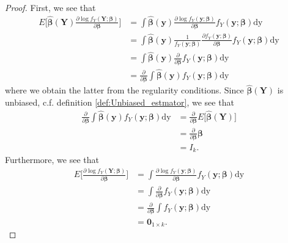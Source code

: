 \begin{proof}
First, we see that
\begin{align*}
    E\Big[\boldsymbol{\hat{\beta}}(\textbf{Y}) \frac{\partial \log f_Y(\textbf{Y};\boldsymbol{\beta})}{\partial \boldsymbol{\beta}} \Big]
    &=\int \boldsymbol{\hat{\beta}}(\textbf{y})\frac{\partial \log f_Y(\textbf{y};\boldsymbol{\beta})}{\partial \boldsymbol{\beta}}f_Y(\textbf{y};\boldsymbol{\beta}) \text{dy} \\
    &= \int \boldsymbol{\hat{\beta}}(\textbf{y})\frac{1}{f_Y(\textbf{y};\boldsymbol{\beta})}\frac{\partial f_Y(\textbf{y};\boldsymbol{\beta})}{\partial \boldsymbol{\beta}}f_Y(\textbf{y};\boldsymbol{\beta}) \text{dy} \\
    &=\int \boldsymbol{\hat{\beta}}(\textbf{y}) \frac{\partial}{\partial \boldsymbol{\beta}}f_Y(\textbf{y};\boldsymbol{\beta}) \text{dy} \\
    &=\frac{\partial}{\partial \boldsymbol{\beta}} \int \boldsymbol{\hat{\beta}}(\textbf{y}) f_Y(\textbf{y};\boldsymbol{\beta}) \text{dy}
\end{align*}
where we obtain the latter from the regularity conditions. 
Since $\boldsymbol{\hat{\beta}}(\textbf{Y})$ is unbiased, c.f. definition \ref{def:Unbiased_estmator}, we see that
\begin{align}
    \frac{\partial}{\partial \boldsymbol{\beta}} \int \boldsymbol{\hat{\beta}}(\textbf{y}) f_Y(\textbf{y};\boldsymbol{\beta}) \text{dy} &= \frac{\partial}{\partial\boldsymbol{\beta}} E\big[ \boldsymbol{\hat{\beta}}(\textbf{Y})\big] \nonumber\\
    &= \frac{\partial}{\partial\boldsymbol{\beta}} \boldsymbol{\beta} \nonumber\\
    &= I_{k} \label{eq:cramerraoe2stjerner}.
\end{align}
Furthermore, we see that
\begin{align}
    E\Big[ \frac{\partial \log f_Y(\textbf{Y};\boldsymbol{\beta})}{\partial \boldsymbol{\beta}}\Big] &= \int \frac{\partial \log f_Y(\textbf{y};\boldsymbol{\beta})}{\partial \boldsymbol{\beta}}f_Y(\textbf{y};\boldsymbol{\beta}) \text{dy} \nonumber \\
    &=\int  \frac{\partial}{\partial \boldsymbol{\beta}}f_Y(\textbf{y};\boldsymbol{\beta}) \text{dy} \nonumber \\
    &=\frac{\partial}{\partial \boldsymbol{\beta}} \int f_Y(\textbf{y};\boldsymbol{\beta}) \text{dy} \nonumber \\
    &= \textbf{0}_{1 \times k} \label{eq:cramerraoe3stjerner}.
\end{align}

\end{proof}
